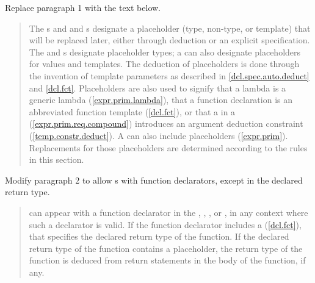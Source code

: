 Replace paragraph 1 with the text below.

\begin{addedblock}
\begin{quote}
\pnum
The s  and 
and s designate a placeholder
(type, non-type, or template) that will be replaced later, either through 
deduction or an explicit specification.
%
The  and  s 
designate placeholder types; a  can 
also designate placeholders for values and templates. 
% 
\enternote
The deduction of placeholders is done through the invention of template
parameters as described in \ref{dcl.spec.auto.deduct} and \ref{dcl.fct}.
\exitnote
%
Placeholders are also used to signify that a lambda is a generic lambda 
(\ref{expr.prim.lambda}), that a function declaration is an
abbreviated function template (\ref{dcl.fct}), or that a 
 in a 
(\ref{expr.prim.req.compound}) introduces an argument deduction constraint 
(\ref{temp.constr.deduct}).
%
\enternote
A  can also include placeholders (\ref{expr.prim}).
Replacements for those placeholders are determined according to the rules
in this section.
\exitnote
% 
\end{quote}
\end{addedblock}


Modify paragraph 2 to allow s
with function declarators, except in the declared return type.

\begin{quote}
\pnum
{} can appear with a function 
declarator in the , ,
, or , 
in any context where such a declarator is valid. 
% 
If the function declarator includes a  
(\ref{dcl.fct}), that specifies the declared return type of the function.
% 
If the declared return type of the function contains a placeholder, the 
return type of the function is deduced from return statements in the body of 
the function, if any.
%
\end{quote}


